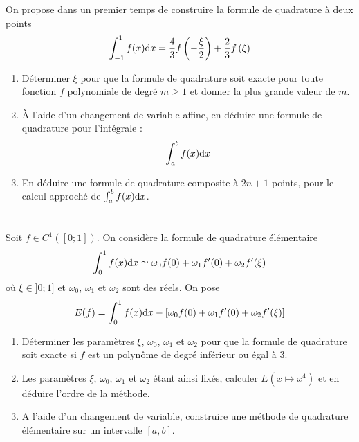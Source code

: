 \documentclass[a4paper]{article}
\def \de {{\rm d}}
\begin{document}


\section{} On propose dans un premier temps de construire la formule de quadrature à deux points
\[\int_{-1}^1f(x)\de x=\frac 43f\left(-\frac{\xi}{2}\right)+\frac 23f\left(\xi\right)\]
\begin{enumerate}
\item Déterminer $\xi$ pour que la formule de quadrature soit exacte pour toute fonction $f$ polynomiale de degré $m \geq 1$ et donner la plus grande valeur de $m$.
\item À l'aide d'un changement de variable affine, en déduire une formule de quadrature pour l'intégrale :
\[\int_{a}^bf(x)\de x\]
\item En déduire une formule de quadrature composite à $2n+1$ points, pour le calcul approché de $\int_{a}^bf(x)\de x$. 
\end{enumerate}




\section{} Soit $f \in C^1([0; 1])$. On considère la formule de quadrature élémentaire \[\int_0^1 f(x) \de x \simeq \omega_0 f(0) +  \omega_1f'(0) +  \omega_2f'(\xi)\]
où $\xi\in ]0; 1]$ et $\omega_0$, $\omega_1$ et $\omega_2$ sont des réels. On pose
\[E(f) =\int_0^1 f(x) \de x -\left[ \omega_0 f(0) +  \omega_1f'(0) +  \omega_2f'(\xi)\right]\]
\begin{enumerate}
\item Déterminer les paramètres $\xi$, $\omega_0$, $\omega_1$ et $\omega_2$ pour que la formule de quadrature soit exacte si $f$ est un polynôme de degré inférieur ou égal à $3$.
\item  Les paramètres $\xi$, $\omega_0$, $\omega_1$ et $\omega_2$ étant ainsi fixés, calculer $E(x \mapsto x^4)$ et en déduire l'ordre de la
méthode. 
\item  A l'aide d'un changement de variable, construire une méthode de quadrature élémentaire sur un intervalle $[a, b]$.
\end{enumerate}

\end{document}
